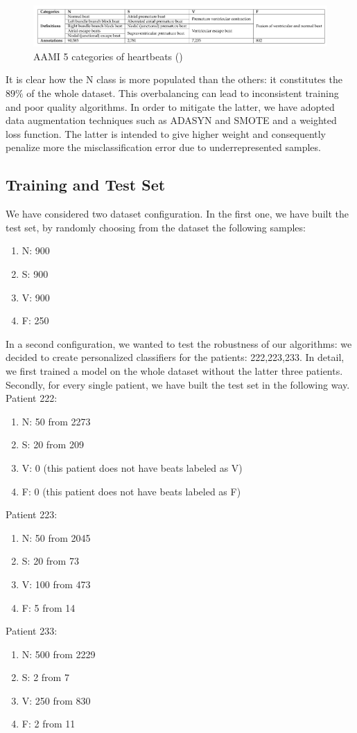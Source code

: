 \documentclass[LaM,binding=0.6cm]{sapthesis}
\begin{document}
\begin{figure}   \centering
    \includegraphics[width=150mm,scale=0.7]{aamiimg}
    \caption{AAMI 5 categories of heartbeats  (\cite{aamistd})}
    \label{fig:aamiimg}
\end{figure}
It is clear how the N class is more populated than the others: it constitutes the $89\%$ of the whole dataset. This overbalancing can lead to inconsistent training and poor quality algorithms. In order to mitigate the latter, we have adopted data augmentation techniques such as ADASYN and SMOTE and a weighted loss function. The latter is intended to give higher weight and consequently penalize more the misclassification error due to underrepresented samples.


\subsection{Training and Test Set}
We have considered two dataset configuration. In the first one, we have built the test set, by randomly choosing from the dataset the following samples:
\begin{enumerate}
\item N: 900
\item S: 900
\item V: 900
\item F: 250
\end{enumerate}
In a second configuration, we wanted to test the robustness of our algorithms: we decided to create personalized classifiers for the patients: 222,223,233. In detail, we first trained a model on the whole dataset without the latter three patients. Secondly, for every single patient, we have built the test set in the following way. Patient 222:
\begin{enumerate}
\item N: 50 from 2273
\item S: 20 from 209
\item V: 0 (this patient does not have beats labeled as V)
\item F: 0 (this patient does not have beats labeled as F)
\end{enumerate}
Patient 223:
\begin{enumerate}
\item N: 50 from 2045
\item S: 20 from 73
\item V: 100 from 473
\item F: 5 from 14
\end{enumerate}
Patient 233:
\begin{enumerate}
\item N: 500 from 2229
\item S: 2 from 7
\item V: 250 from 830
\item F: 2 from 11
\end{enumerate}
\end{document}
